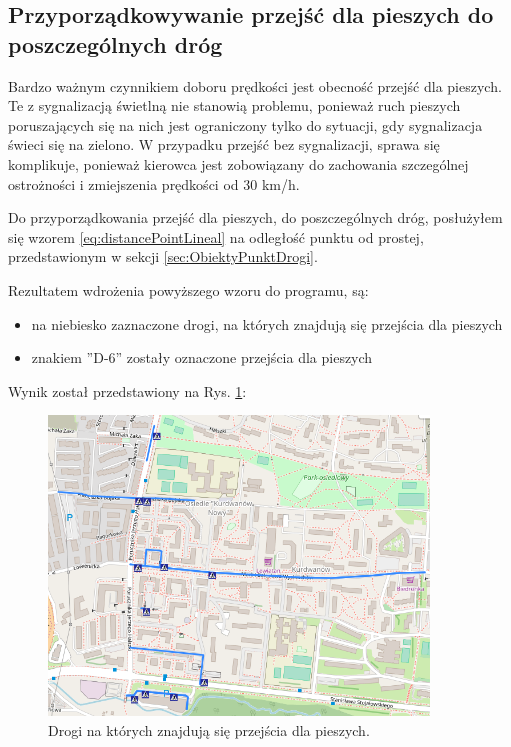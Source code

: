 \subsection{Przyporządkowywanie przejść dla pieszych do poszczególnych dróg}

Bardzo ważnym czynnikiem doboru prędkości jest obecność przejść dla pieszych. Te z sygnalizacją świetlną nie stanowią problemu, ponieważ ruch pieszych poruszających się na nich jest ograniczony tylko do sytuacji, gdy sygnalizacja świeci się na zielono. W przypadku przejść bez sygnalizacji, sprawa się komplikuje, ponieważ kierowca jest zobowiązany do zachowania szczególnej ostrożności i zmiejszenia prędkości od 30 km/h.

Do przyporządkowania przejść dla pieszych, do poszczególnych dróg, posłużyłem się wzorem \ref{eq:distancePointLineal} na odległość punktu od prostej, przedstawionym w sekcji \ref{sec:ObiektyPunktDrogi}.


Rezultatem wdrożenia powyższego wzoru do programu, są:
\begin{itemize}
\item na niebiesko zaznaczone drogi, na których znajdują się przejścia dla pieszych
\item znakiem ''D-6'' zostały oznaczone przejścia dla pieszych
\end{itemize}
Wynik został przedstawiony na Rys. \ref{sec:PrzejscieDrogi}:

\begin{figure}[h]
\caption{Drogi na których znajdują się przejścia dla pieszych.}
\label{sec:PrzejscieDrogi}
\centering
\includegraphics[width=0.9\textwidth]{PrzejscieDrogi}
\end{figure}

